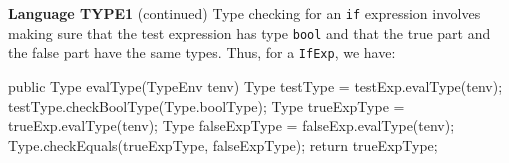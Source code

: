 \begin{minipage}[t]{\sw}
\slidenumber
\LARGE
{\bf Language TYPE1} (continued)\exx
Type checking for an \verb'if' expression involves
making sure that the test expression has type \verb'bool'
and that the true part and the false part have the same types.
Thus, for a \verb'IfExp', we have:
\Large
\begin{qv}
public Type evalType(TypeEnv tenv) {
    Type testType = testExp.evalType(tenv);
    testType.checkBoolType(Type.boolType);
    Type trueExpType = trueExp.evalType(tenv);
    Type falseExpType = falseExp.evalType(tenv);
    Type.checkEquals(trueExpType, falseExpType);
    return trueExpType;
}
\end{qv}

\end{minipage}
